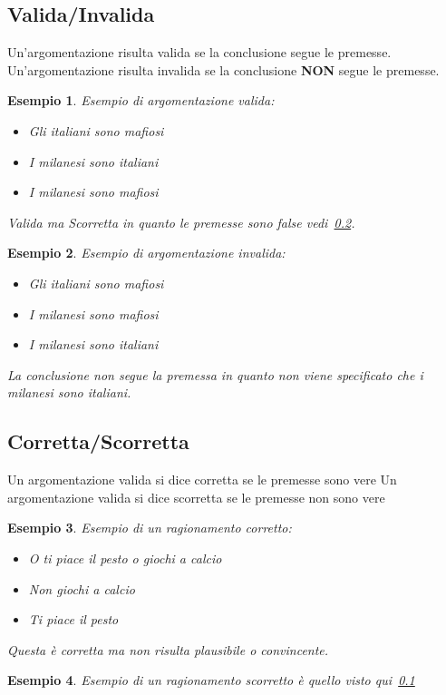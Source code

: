 \documentclass{article}
\newtheorem{exmp}{Esempio}[section]
\theoremstyle{definition}
\begin{document}
\subsection{Valida/Invalida}\label{sec:valida_invalida}
Un'argomentazione risulta valida se la conclusione segue le premesse. \newline
Un'argomentazione risulta invalida se la conclusione \textbf{NON} segue le premesse. \newline
\begin{exmp}
        Esempio di argomentazione valida: \newline
        \begin{itemize}
                \item Gli italiani sono mafiosi
                \item I milanesi sono italiani
                \item I milanesi sono mafiosi
        \end{itemize}
        Valida ma Scorretta in quanto le premesse sono false vedi~\ref{sec:corretta_scorretta}.
\end{exmp}
\begin{exmp}
        Esempio di argomentazione invalida: \newline
        \begin{itemize}
                \item Gli italiani sono mafiosi
                \item I milanesi sono mafiosi 
                \item I milanesi sono italiani 
        \end{itemize}
        La conclusione non segue la premessa in quanto non viene specificato che i milanesi sono italiani.
\end{exmp}



\subsection{Corretta/Scorretta}\label{sec:corretta_scorretta}
Un argomentazione valida si dice corretta se le premesse sono vere \newline
Un argomentazione valida si dice scorretta se le premesse non sono vere \newline
\begin{exmp}
        Esempio di un ragionamento corretto:
        \begin{itemize}
                \item O ti piace il pesto o giochi a calcio
                \item Non giochi a calcio
                \item Ti piace il pesto
        \end{itemize}
        Questa è corretta ma non risulta plausibile o convincente.
\end{exmp}
\begin{exmp}
        Esempio di un ragionamento scorretto è quello visto qui~\ref{sec:valida_invalida}
\end{exmp}
\end{document}
